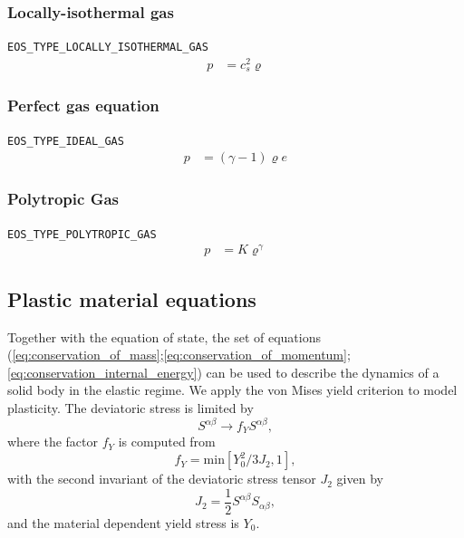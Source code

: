 \documentclass[10pt,fleqn,twoside]{article}
\begin{document}
\subsubsection{Locally-isothermal gas}
\texttt{EOS\_TYPE\_LOCALLY\_ISOTHERMAL\_GAS}
\begin{align}
    p & = c_s^2 \varrho
\end{align}
\subsubsection{Perfect gas equation}
\texttt{EOS\_TYPE\_IDEAL\_GAS}
\begin{align}
    p & = (\gamma-1) \varrho e
\end{align}
\subsubsection{Polytropic Gas}
\texttt{EOS\_TYPE\_POLYTROPIC\_GAS}
\begin{align}
    p & = K \varrho^\gamma
\end{align}
\subsection{Plastic material equations}
Together with the equation of state, the set of equations
(\ref{eq:conservation_of_mass};\ref{eq:conservation_of_momentum};\ref{eq:conservation_internal_energy}) can be used to
describe the dynamics of a solid body in the elastic regime. We apply the von Mises yield
criterion \citep{vonmises1913} to model plasticity. The deviatoric stress is
limited by
%
\begin{equation}
S^{\alpha \beta} \rightarrow f_Y S^{\alpha \beta},
\end{equation}
where the factor $f_Y$ is computed from
\begin{equation}
f_Y = \mathrm{min} \left[ Y_0^2/3J_2, 1 \right],
\end{equation}
with the second invariant of the deviatoric stress tensor $J_2$ given by
%
\begin{equation}
J_2 = \frac{1}{2} S^{\alpha \beta} S_{\alpha \beta},
\end{equation}
and the material dependent yield stress is $Y_0$.
%
\end{document}
